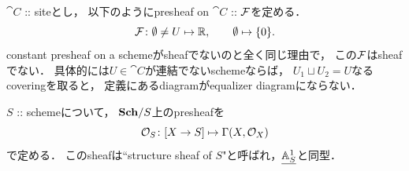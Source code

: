\documentclass[a4paper]{jsarticle}
\begin{document}
\begin{Example}
    $\cat{C}$ :: siteとし，
    以下のようにpresheaf on $\cat{C}$ :: $\mathcal{F}$を定める．
    \[ \mathcal{F} \colon \emptyset \neq U \mapsto \mathbb{R}, \qquad \emptyset \mapsto \{0\}.  \]
    constant presheaf on a schemeがsheafでないのと全く同じ理由で，
    この$\mathcal{F}$はsheafでない．
    具体的には$U \in \cat{C}$が連結でないschemeならば，
    $U_1 \sqcup U_2=U$なるcoveringを取ると，
    定義にあるdiagramがequalizer diagramにならない．
\end{Example}

\begin{Example}
    $S$ :: schemeについて，
    $\mathbf{Sch}/S$上のpresheafを
    \[ \mathcal{O}_S \colon [X \to S] \mapsto \Gamma(X, \mathcal{O}_X) \]
    で定める．
    このsheafは``structure sheaf of $S$"と呼ばれ，$\underline{\mathbb{A}^1_S}$と同型．
\end{Example}



\end{document}
